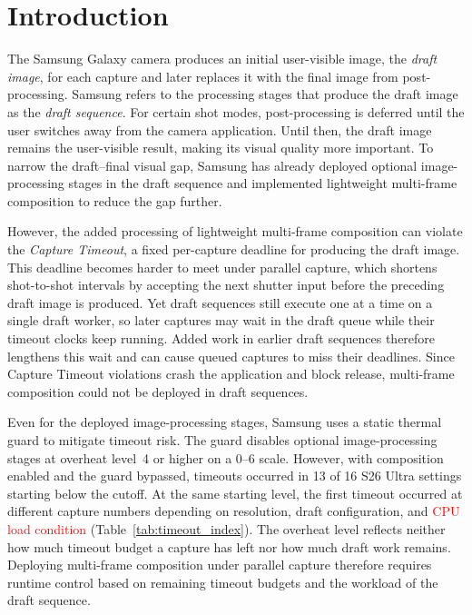 \section{Introduction}
\label{sec:introduction}

The Samsung Galaxy camera produces an initial user-visible image, the \emph{draft image}, for each capture and later replaces it with the final image from post-processing.
Samsung refers to the processing stages that produce the draft image as the \emph{draft sequence}.
For certain shot modes, post-processing is deferred until the user switches away from the camera application.
Until then, the draft image remains the user-visible result, making its visual quality more important.
To narrow the draft--final visual gap, Samsung has already deployed optional image-processing stages in the draft sequence and implemented lightweight multi-frame composition to reduce the gap further.

However, the added processing of lightweight multi-frame composition can violate the \emph{Capture Timeout}, a fixed per-capture deadline for producing the draft image.
This deadline becomes harder to meet under parallel capture, which shortens shot-to-shot intervals by accepting the next shutter input before the preceding draft image is produced.
Yet draft sequences still execute one at a time on a single draft worker, so later captures may wait in the draft queue while their timeout clocks keep running.
Added work in earlier draft sequences therefore lengthens this wait and can cause queued captures to miss their deadlines.
Since Capture Timeout violations crash the application and block release, multi-frame composition could not be deployed in draft sequences.

Even for the deployed image-processing stages, Samsung uses a static thermal guard to mitigate timeout risk.
The guard disables optional image-processing stages at overheat level~4 or higher on a 0--6 scale.
However, with composition enabled and the guard bypassed, timeouts occurred in 13 of 16 S26 Ultra settings starting below the cutoff.
At the same starting level, the first timeout occurred at different capture numbers depending on resolution, draft configuration, and \textcolor{red}{CPU load condition} (Table~\ref{tab:timeout_index}).
The overheat level reflects neither how much timeout budget a capture has left nor how much draft work remains.
Deploying multi-frame composition under parallel capture therefore requires runtime control based on remaining timeout budgets and the workload of the draft sequence.

